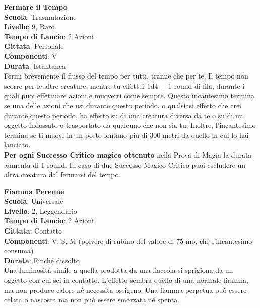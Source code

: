 \begin{multicols}{2}
\medskip\textbf{Fermare il Tempo}\\
\textbf{Scuola}: Trasmutazione\\
\textbf{Livello}: 9, Raro\\
\textbf{Tempo di Lancio}: 2 Azioni\\
\textbf{Gittata}: Personale\\
\textbf{Componenti}: V\\
\textbf{Durata}: Istantanea\\
Fermi brevemente il flusso del tempo per tutti, tranne che per te. Il tempo non scorre per le altre creature, mentre tu effettui 1d4 + 1 round di fila, durante i quali puoi effettuare azioni e muoverti come sempre. Questo incantesimo termina se una delle azioni che usi durante questo periodo, o qualsiasi effetto che crei durante questo periodo, ha effetto su di una creatura diversa da te o su di un oggetto indossato o trasportato da qualcuno che non sia tu. Inoltre, l'incantesimo termina se ti muovi in un posto lontano più di 300 metri da quello in cui lo hai lanciato.\\
\textbf{Per ogni Successo Critico magico ottenuto} nella Prova di Magia la durata aumenta di 1 round. In caso di due Successo Magico Critico puoi escludere un altra creatura dal fermarsi del tempo.

\medskip\textbf{Fiamma Perenne}\\
\textbf{Scuola}: Universale\\
\textbf{Livello}: 2, Leggendario\\
\textbf{Tempo di Lancio}: 2 Azioni\\
\textbf{Gittata}: Contatto\\
\textbf{Componenti}: V, S, M (polvere di rubino del valore di 75 mo, che l'incantesimo consuma)\\
\textbf{Durata}: Finché dissolto\\
Una luminosità simile a quella prodotta da una fiaccola si sprigiona da un oggetto con cui sei in contatto. L'effetto sembra quello di una normale fiamma, ma non produce calore né necessita ossigeno. Una fiamma perpetua può essere celata o nascosta ma non può essere smorzata né spenta.


\end{multicols}
